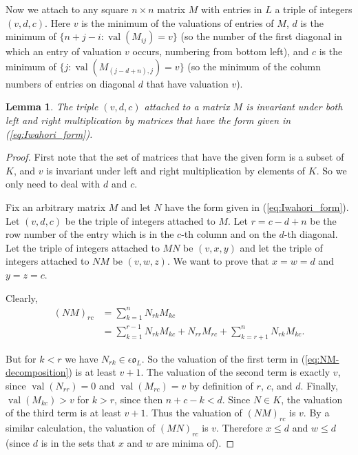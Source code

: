 \documentclass{amsart}
\newtheorem{lemma}{Lemma}[subsection]
\theoremstyle{definition}
\def\O{\mathfrak{o}}
\def\e{\epsilon}
\def\val{\mathop{\mathrm{val}}}
\begin{document}
  Now we attach to any square $n \times n$ matrix $M$ with entries in $L$ a
  triple of integers $(v, d, c)$.  Here $v$ is the minimum of the valuations of
  entries of $M$, $d$ is the minimum of $\{ n + j-i : \val(M_{ij}) = v\}$ (so
  the number of the first diagonal in which an entry of valuation $v$ occurs,
  numbering from bottom left), and $c$ is the minimum of $\{ j :
  \val(M_{(j-d+n),j}) = v\}$ (so the minimum of the column numbers of entries
  on diagonal $d$ that have valuation $v$).

  \begin{lemma}
    \label{lemma:Triple_lemma}
    The triple $(v, d, c)$ attached to a matrix $M$ is invariant under both
    left and right multiplication by matrices that have the form given in
    (\ref{eq:Iwahori_form}).
  \end{lemma}
  \begin{proof}
    First note that the set of matrices that have the given form is a subset of
    $K$, and $v$ is invariant under left and right multiplication by elements
    of $K$.  So we only need to deal with $d$ and $c$.

    Fix an arbitrary matrix $M$ and let $N$ have the form given in
    (\ref{eq:Iwahori_form}). Let $(v, d, c)$ be the triple of integers attached
    to $M$.  Let $r = c - d + n$ be the row number of the entry which is in the
    $c$-th column and on the $d$-th diagonal.  Let the triple of integers
    attached to $MN$ be $(v, x, y)$ and let the triple of integers attached to
    $NM$ be $(v, w, z)$.  We want to prove that $x = w = d$ and $y = z = c$.

    Clearly,
    \begin{align}
      (NM)_{rc} &= \sum_{k = 1}^n N_{rk}M_{kc} \nonumber \\
      \label{eq:NM-decomposition}
      &= \sum_{k = 1}^{r-1}N_{rk}M_{kc} + N_{rr}M_{rc} +
         \sum_{k = r+1}^{n}N_{rk}M_{kc}.
    \end{align}

    But for $k < r$ we have $N_{rk} \in \e\O_L$.  So the valuation of the first
    term in (\ref{eq:NM-decomposition}) is at least $v + 1$.  The valuation of
    the second term is exactly $v$, since $\val(N_{rr}) = 0$ and $\val(M_{rc})
    = v$ by definition of $r$, $c$, and $d$.  Finally, $\val(M_{kc}) > v$ for
    $k > r$, since then $n + c - k < d$.  Since $N \in K$, the valuation of the
    third term is at least $v + 1$.  Thus the valuation of $(NM)_{rc}$ is $v$.
    By a similar calculation, the valuation of $(MN)_{rc}$ is $v$.  Therefore
    $x \le d$ and $w \le d$ (since $d$ is in the sets that $x$ and $w$ are
    minima of).


\end{proof}
\end{document}
